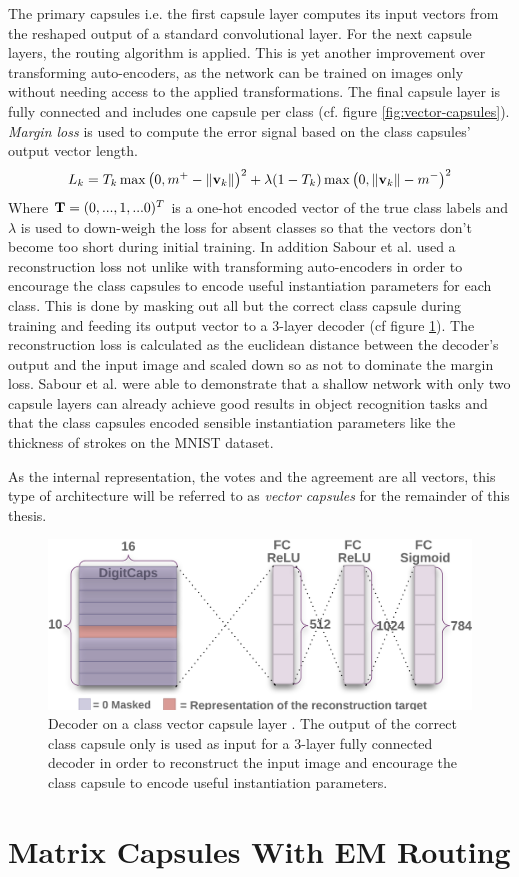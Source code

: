 The primary capsules i.e. the first capsule layer computes its input vectors from the reshaped output of a standard convolutional layer. For the next capsule layers, the routing algorithm is applied. This is yet another improvement over transforming auto-encoders, as the network can be trained on images only without needing access to the applied transformations. The final capsule layer is fully connected and includes one capsule per class (cf. figure \ref{fig:vector-capsules}). \emph{Margin loss} is used to compute the error signal based on the class capsules' output vector length.
\begin{align}
    L_k = T_k \operatorname{max}\qty(0,m^+ - \norm{\vb{v}_k})^2 + \lambda \qty(1-T_k) \operatorname{max}\qty(0, \norm{\vb{v}_k}-m^-)^2
\end{align}
Where $\vb{T} = (0,...,1,...0)^T$ is a one-hot encoded vector of the true class labels and $\lambda$ is used to down-weigh the loss for absent classes so that the vectors don't become too short during initial training. In addition Sabour et al. used a reconstruction loss not unlike with transforming auto-encoders in order to encourage the class capsules to encode useful instantiation parameters for each class. This is done by masking out all but the correct class capsule during training and feeding its output vector to a 3-layer decoder (cf figure \ref{fig:vector-capsules-reconstr}). The reconstruction loss is calculated as the euclidean distance between the decoder's output and the input image and scaled down so as not to dominate the margin loss. Sabour et al. were able to demonstrate that a shallow network with only two capsule layers can already achieve good results in object recognition tasks and that the class capsules encoded sensible instantiation parameters like the thickness of strokes on the MNIST dataset.

As the internal representation, the votes and the agreement are all vectors, this type of architecture will be referred to as \emph{vector capsules} for the remainder of this thesis.
\begin{figure}
    \centering
    \includegraphics[width=.75\textwidth]{figures/vector-capsules-reconstr.png}
\caption[Decoder on a class vector capsule layer]{Decoder on a class vector capsule layer \cite{sabour2017dynamic}. The output of the correct class capsule only is used as input for a 3-layer fully connected decoder in order to reconstruct the input image and encourage the class capsule to encode useful instantiation parameters.}\label{fig:vector-capsules-reconstr}
\end{figure}\noindent
\section{Matrix Capsules With EM Routing}